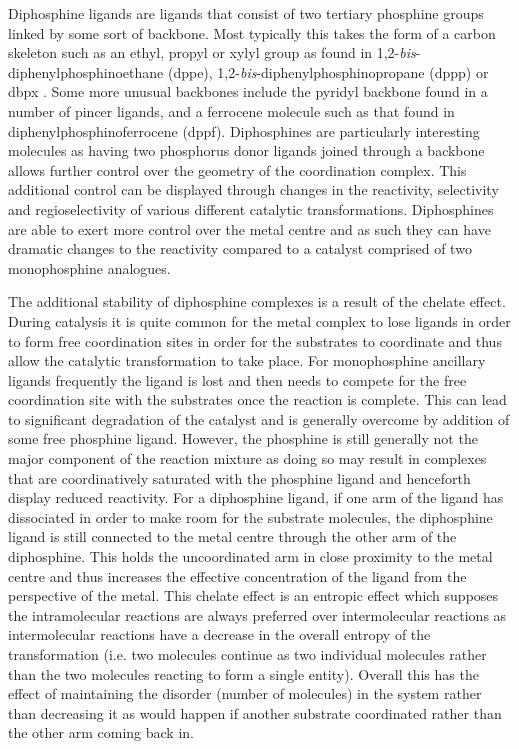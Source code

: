Diphosphine ligands are ligands that consist of two tertiary phosphine groups linked by some sort of backbone.  Most typically this takes the form of a carbon skeleton such as an ethyl, propyl or xylyl group as found in 1,2-\emph{bis}-diphenylphosphinoethane (dppe), 1,2-\emph{bis}-diphenylphosphinopropane (dppp) or dbpx .  Some more unusual backbones include the pyridyl backbone found in a number of pincer ligands, and a ferrocene molecule such as that found in diphenylphosphinoferrocene (dppf).  Diphosphines are particularly interesting molecules as having two phosphorus donor ligands joined through a backbone allows further control over the geometry of the coordination complex.  This additional control can be displayed through changes in the reactivity, selectivity and regioselectivity of various different catalytic transformations.  Diphosphines are able to exert more control over the metal centre and as such they can have dramatic changes to the reactivity compared to a catalyst comprised of two monophosphine analogues.  

The additional stability of diphosphine complexes is a result of the chelate effect.  During catalysis it is quite common for the metal complex to lose ligands in order to form free coordination sites in order for the substrates to coordinate and thus allow the catalytic transformation to take place.  For monophosphine ancillary ligands frequently the ligand is lost and then needs to compete for the free coordination site with the substrates once the reaction is complete.  This can lead to significant degradation of the catalyst and is generally overcome by addition of some free phosphine ligand.  However, the phosphine is still generally not the major component of the reaction mixture as doing so may result in complexes that are coordinatively saturated with the phosphine ligand and henceforth display reduced reactivity.  For a diphosphine ligand, if one arm of the ligand has dissociated in order to make room for the substrate molecules, the diphosphine ligand is still connected to the metal centre through the other arm of the diphosphine.  This holds the uncoordinated arm in close proximity to the metal centre and thus increases the effective concentration of the ligand from the perspective of the metal.  This chelate effect is an entropic effect which supposes the intramolecular reactions are always preferred over intermolecular reactions as intermolecular reactions have a decrease in the overall entropy of the transformation (i.e. two molecules continue as two individual molecules rather than the two molecules reacting to form a single entity).  Overall this has the effect of maintaining the disorder (number of molecules) in the system rather than decreasing it as would happen if another substrate coordinated rather than the other arm coming back in.

